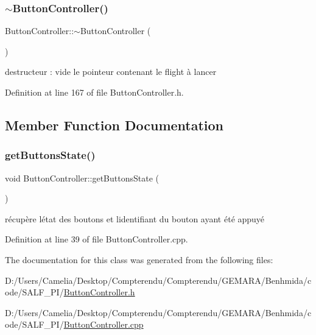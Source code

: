 \mbox{\label{class_button_controller_a0fd052bda98ee3121d39820894abbe2c}} 
\subsubsection{\texorpdfstring{$\sim$\+Button\+Controller()}{~ButtonController()}}
{\footnotesize\ttfamily Button\+Controller\+::$\sim$\+Button\+Controller (\begin{DoxyParamCaption}{ }\end{DoxyParamCaption})\hspace{0.3cm}{\ttfamily [inline]}}



destructeur \+: vide le pointeur contenant le flight à lancer 



Definition at line 167 of file Button\+Controller.\+h.



\subsection{Member Function Documentation}
\mbox{\label{class_button_controller_a3c26811d268e3c4c16df241775dff030}} 
\subsubsection{\texorpdfstring{get\+Buttons\+State()}{getButtonsState()}}
{\footnotesize\ttfamily void Button\+Controller\+::get\+Buttons\+State (\begin{DoxyParamCaption}{ }\end{DoxyParamCaption})}



récupère l\textquotesingle{}état des boutons et l\textquotesingle{}identifiant du bouton ayant été appuyé 



Definition at line 39 of file Button\+Controller.\+cpp.



The documentation for this class was generated from the following files\+:\begin{DoxyCompactItemize}
\item 
D\+:/\+Users/\+Camelia/\+Desktop/\+Compterendu/\+Compterendu/\+G\+E\+M\+A\+R\+A/\+Benhmida/code/\+S\+A\+L\+F\+\_\+\+P\+I/\hyperlink{_button_controller_8h}{Button\+Controller.\+h}\item 
D\+:/\+Users/\+Camelia/\+Desktop/\+Compterendu/\+Compterendu/\+G\+E\+M\+A\+R\+A/\+Benhmida/code/\+S\+A\+L\+F\+\_\+\+P\+I/\hyperlink{_button_controller_8cpp}{Button\+Controller.\+cpp}\end{DoxyCompactItemize}
